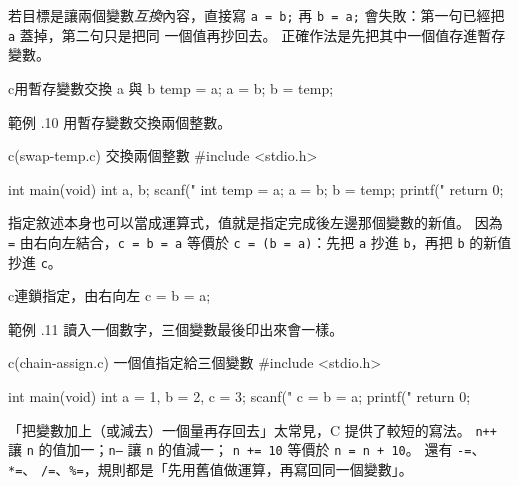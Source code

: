 
若目標是讓兩個變數\emph{互換}內容，直接寫 \texttt{a = b;} 再
\texttt{b = a;} 會失敗：第一句已經把 \texttt{a} 蓋掉，第二句只是把同
一個值再抄回去。 正確作法是先把其中一個值存進暫存變數。

\begin{code}{c}{用暫存變數交換 a 與 b}
temp = a;
a = b;
b = temp;
\end{code}

範例 \thechapter.10 用暫存變數交換兩個整數。

\begin{example}{c}{(swap-temp.c) 交換兩個整數}
#include <stdio.h>

int main(void) {
    int a, b;
    scanf("%
    int temp = a;
    a = b;
    b = temp;
    printf("%
    return 0;
}
\end{example}


指定敘述本身也可以當成運算式，值就是指定完成後左邊那個變數的新值。
因為 \texttt{=} 由右向左結合，\texttt{c = b = a} 等價於
\texttt{c = (b = a)}：先把 \texttt{a} 抄進 \texttt{b}，再把 \texttt{b}
的新值抄進 \texttt{c}。

\begin{code}{c}{連鎖指定，由右向左}
c = b = a;
\end{code}

範例 \thechapter.11 讀入一個數字，三個變數最後印出來會一樣。

\begin{example}{c}{(chain-assign.c) 一個值指定給三個變數}
#include <stdio.h>

int main(void) {
    int a = 1, b = 2, c = 3;
    scanf("%
    c = b = a;
    printf("%
    return 0;
}
\end{example}


「把變數加上（或減去）一個量再存回去」太常見，C 提供了較短的寫法。
\texttt{n++} 讓 \texttt{n} 的值加一；\texttt{n--} 讓 \texttt{n} 的值減一；
\texttt{n += 10} 等價於 \texttt{n = n + 10}。 還有 \texttt{-=}、\texttt{*=}、
\texttt{/=}、\texttt{\%=}，規則都是「先用舊值做運算，再寫回同一個變數」。

